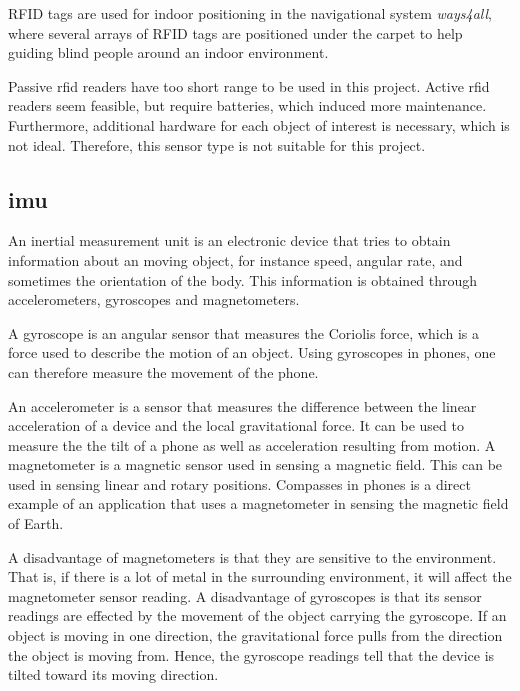 RFID tags are used for indoor positioning in the navigational system \textit{ways4all}, where several arrays of RFID tags are positioned under the carpet to help guiding blind people around an indoor environment\cite{HabilitationThesis}.

Passive \gls{rfid} readers have too short range to be used in this project. Active \gls{rfid} readers seem feasible, but require batteries, which induced more maintenance. Furthermore, additional hardware for each object of interest is necessary, which is not ideal. Therefore, this sensor type is not suitable for this project.

\subsection{\acrlong{imu}} \label{imu-section}

An inertial measurement unit is an electronic device that tries to obtain information about an moving object, for instance speed, angular rate, and sometimes the orientation of the body. This information is obtained through accelerometers, gyroscopes and magnetometers.

A gyroscope is an angular sensor that measures the Coriolis force, which is a force used to describe the motion of an object\cite{Gyroscope}. Using gyroscopes in phones, one can therefore measure the movement of the phone.

An accelerometer is a sensor that measures the difference between the linear acceleration of a device and the local gravitational force\cite{Accelerometer}. It can be used to measure the the tilt of a phone as well as acceleration resulting from motion\cite{Accelerometer2}.
A magnetometer is a magnetic sensor used in sensing a magnetic field. This can be used in sensing linear and rotary positions. Compasses in phones is a direct example of an application that uses a magnetometer in sensing the magnetic field of Earth.\cite{Magnetometer}

A disadvantage of magnetometers is that they are sensitive to the environment. That is, if there is a lot of metal in the surrounding environment, it will affect the magnetometer sensor reading.\cite{MagnetometerAdvDisadv} %
A disadvantage of gyroscopes is that its sensor readings are effected by the movement of the object carrying the gyroscope. If an object is moving in one direction, the gravitational force pulls from the direction the object is moving from. Hence, the gyroscope readings tell that the device is tilted toward its moving direction.\cite{Gyroscope}

